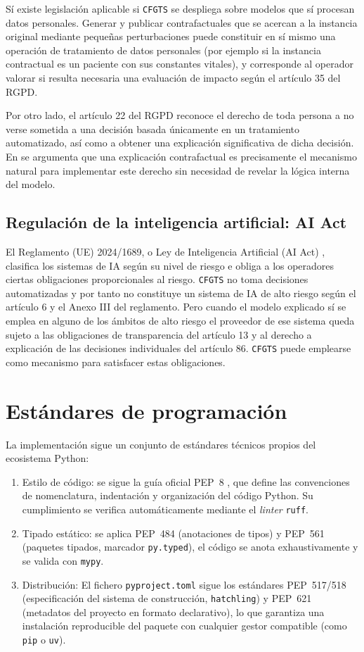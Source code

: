 \documentclass[12pt]{report} %
\begin{document}
Sí existe legislación aplicable si \texttt{CFGTS} se despliega sobre modelos que sí procesan datos personales. Generar y publicar contrafactuales que se acercan a la instancia original mediante pequeñas perturbaciones puede constituir en sí mismo una operación de tratamiento de datos personales (por ejemplo si la instancia contractual es un paciente con sus constantes vitales), y corresponde al operador valorar si resulta necesaria una evaluación de impacto según el artículo 35 del RGPD.

Por otro lado, el artículo 22 del RGPD reconoce el derecho de toda persona a no verse sometida a una decisión basada únicamente en un tratamiento automatizado, así como a obtener una explicación significativa de dicha decisión. En \cite{Wachter2017} se argumenta que una explicación contrafactual es precisamente el mecanismo natural para implementar este derecho sin necesidad de revelar la lógica interna del modelo.

\subsection{Regulación de la inteligencia artificial: AI Act}

El Reglamento (UE) 2024/1689, o Ley de Inteligencia Artificial (AI Act) \cite{aiact2024}, clasifica los sistemas de IA según su nivel de riesgo e obliga a los operadores ciertas obligaciones proporcionales al riesgo. \texttt{CFGTS} no toma decisiones automatizadas y por tanto no constituye un sistema de IA de alto riesgo según el artículo 6 y el Anexo III del reglamento. Pero cuando el modelo explicado sí se emplea en alguno de los ámbitos de alto riesgo el proveedor de ese sistema queda sujeto a las obligaciones de transparencia del artículo 13 y al derecho a explicación de las decisiones individuales del artículo 86. \texttt{CFGTS} puede emplearse como mecanismo para satisfacer estas obligaciones.

\section{Estándares de programación}

La implementación sigue un conjunto de estándares técnicos propios del ecosistema Python:
\begin{enumerate}
    \item Estilo de código: se sigue la guía oficial PEP~8 \cite{pep8}, que define las convenciones de nomenclatura, indentación y organización del código Python. Su cumplimiento se verifica automáticamente mediante el \textit{linter} \texttt{ruff}.
    \item Tipado estático: se aplica PEP~484 (anotaciones de tipos) y PEP~561 (paquetes tipados, marcador \texttt{py.typed}), el código se anota exhaustivamente y se valida con \texttt{mypy}.
    \item Distribución: El fichero \texttt{pyproject.toml} sigue los estándares PEP~517/518 (especificación del sistema de construcción, \texttt{hatchling}) y PEP~621 (metadatos del proyecto en formato declarativo), lo que garantiza una instalación reproducible del paquete con cualquier gestor compatible (como \texttt{pip} o \texttt{uv}).
\end{enumerate}
\end{document}
